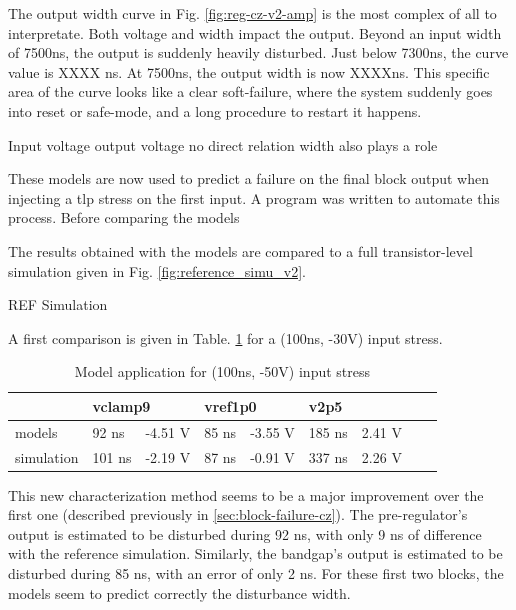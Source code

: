 The output width curve in Fig. \ref{fig:reg-cz-v2-amp} is the most complex of all to interpretate.
Both voltage and width impact the output.
Beyond an input width of 7500ns, the output is suddenly heavily disturbed.
Just below 7300ns, the curve value is XXXX ns.
At 7500ns, the output width is now XXXXns.
This specific area of the curve looks like a clear soft-failure, where the system suddenly goes into reset or safe-mode, and a long procedure to restart it happens.

Input voltage output voltage no direct relation
width also plays a role

These models are now used to predict a failure on the final block output when injecting a \gls{tlp} stress on the first input.
A program was written to automate this process.
Before comparing the models

The results obtained with the models are compared to a full transistor-level simulation given in Fig. \ref{fig:reference_simu_v2}.

REF Simulation

A first comparison is given in Table. \ref{tab:model-v2-vs-sim} for a (100ns, -30V) input stress.

\begin{table}[!h]
\centering
\begin{tabular}{@{}lllllllll@{}}
           & \multicolumn{2}{l}{vclamp9}          & \multicolumn{2}{l}{vref1p0}          & \multicolumn{2}{l}{v2p5}               \\
\toprule
models     & 92 ns  & \textcolor{red!90}{-4.51 V} & 85 ns & \textcolor{red!90}{-3.55 V}  & \textcolor{red!90}{185 ns} & \textcolor{blue!90}{2.41 V} \\
simulation & 101 ns & -2.19 V                     & 87 ns & -0.91 V                      & 337 ns      & 2.26 V
\end{tabular}
\caption{Model application for (100ns, -50V) input stress}
\label{tab:model-v2-vs-sim}
\end{table}

This new characterization method seems to be a major improvement over the first one (described previously in \ref{sec:block-failure-cz}).
The pre-regulator's output is estimated to be disturbed during 92 ns, with only 9 ns of difference with the reference simulation.
Similarly, the bandgap's output is estimated to be disturbed during 85 ns, with an error of only 2 ns.
For these first two blocks, the models seem to predict correctly the disturbance width.

